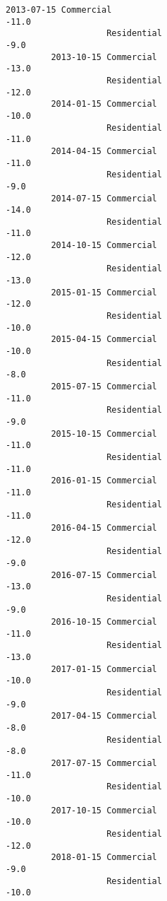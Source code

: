 \documentclass[11pt]{article}
\begin{document}
\begin{Verbatim}[commandchars=\\\{\}]
         2013-07-15 Commercial                                             -11.0   
                    Residential                                             -9.0   
         2013-10-15 Commercial                                             -13.0   
                    Residential                                            -12.0   
         2014-01-15 Commercial                                             -10.0   
                    Residential                                            -11.0   
         2014-04-15 Commercial                                             -11.0   
                    Residential                                             -9.0   
         2014-07-15 Commercial                                             -14.0   
                    Residential                                            -11.0   
         2014-10-15 Commercial                                             -12.0   
                    Residential                                            -13.0   
         2015-01-15 Commercial                                             -12.0   
                    Residential                                            -10.0   
         2015-04-15 Commercial                                             -10.0   
                    Residential                                             -8.0   
         2015-07-15 Commercial                                             -11.0   
                    Residential                                             -9.0   
         2015-10-15 Commercial                                             -11.0   
                    Residential                                            -11.0   
         2016-01-15 Commercial                                             -11.0   
                    Residential                                            -11.0   
         2016-04-15 Commercial                                             -12.0   
                    Residential                                             -9.0   
         2016-07-15 Commercial                                             -13.0   
                    Residential                                             -9.0   
         2016-10-15 Commercial                                             -11.0   
                    Residential                                            -13.0   
         2017-01-15 Commercial                                             -10.0   
                    Residential                                             -9.0   
         2017-04-15 Commercial                                              -8.0   
                    Residential                                             -8.0   
         2017-07-15 Commercial                                             -11.0   
                    Residential                                            -10.0   
         2017-10-15 Commercial                                             -10.0   
                    Residential                                            -12.0   
         2018-01-15 Commercial                                              -9.0   
                    Residential                                            -10.0   
         

\end{Verbatim}
\end{document}
